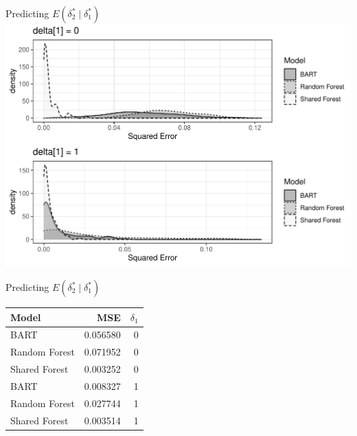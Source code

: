 \documentclass{beamer}
\begin{document}
\begin{frame}{Predicting $E(\delta_2^* \mid \delta_1^*)$ }
\includegraphics[width = .9\linewidth]{binary_sim_results.pdf}
\end{frame}

\begin{frame}{Predicting $E(\delta_2^* \mid \delta_1^*)$ }
\begin{table}[ht]
\centering
\begin{tabular}{lrr}
  \hline
Model & MSE & $\delta_1$ \\ 
  \hline
BART & 0.056580 & 0 \\ 
  Random Forest & 0.071952 & 0 \\ 
  Shared Forest & 0.003252 & 0 \\ 
  BART & 0.008327 & 1 \\ 
  Random Forest & 0.027744 & 1 \\ 
  Shared Forest & 0.003514 & 1 \\ 
   \hline
\end{tabular}
\end{table}
\end{frame}
\end{document}
